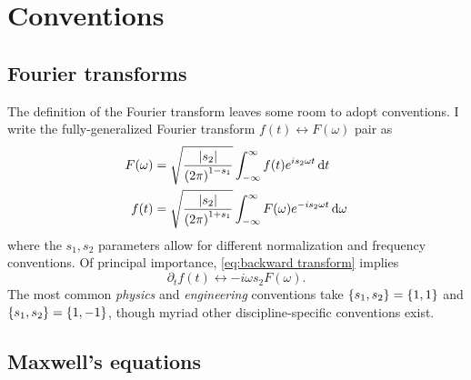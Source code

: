 \chapter{Conventions}

\section{Fourier transforms\label{sec:general transform}}

The definition of the Fourier transform leaves some room to adopt conventions.
I write the fully-generalized Fourier transform $f(t) \leftrightarrow F(\omega)$ pair as
\begin{subequations}
  \begin{align}
    F(\omega) &= \sqrt{\frac{\abs{s_2}}{\qty(2\pi)^{1-s_1}}} \int_{-\infty}^{\infty} f(t) e^{i s_2 \omega t} \dd{t} \label{eq:forward transform} \\
    f(t) &= \sqrt{\frac{\abs{s_2}}{\qty(2\pi)^{1+s_1}}} \int_{-\infty}^{\infty} F(\omega) e^{- i s_2 \omega t} \dd{\omega} \label{eq:backward transform}
  \end{align}
\end{subequations}
where the $s_1, s_2$ parameters allow for different normalization and frequency conventions. 
Of principal importance, \cref{eq:backward transform} implies
\begin{equation}
  \partial_t f(t) \leftrightarrow -i \omega s_2 F(\omega).
\end{equation}
The most common \emph{physics} and \emph{engineering} conventions take $\qty{s_1, s_2} = \qty{1, 1}$ and $\qty{s_1, s_2} = \qty{1, -1}$, though myriad other discipline-specific conventions exist.

\section{\label{appendix:maxwell}Maxwell's equations}

